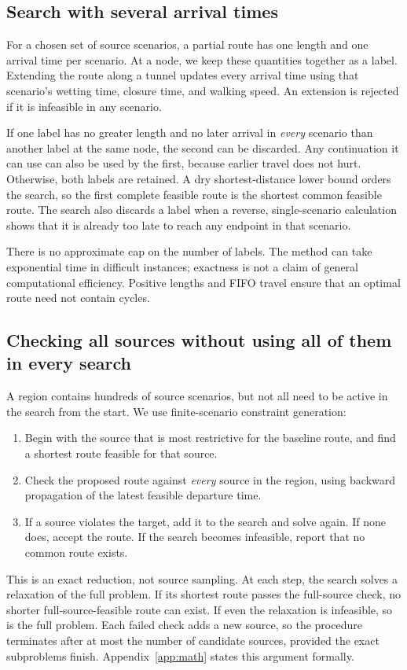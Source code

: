 \documentclass[11pt,a4paper]{article}
\begin{document}
\subsection{Search with several arrival times}
For a chosen set of source scenarios, a partial route has one length and one arrival time per scenario. At a node, we keep these quantities together as a label. Extending the route along a tunnel updates every arrival time using that scenario's wetting time, closure time, and walking speed. An extension is rejected if it is infeasible in any scenario.

If one label has no greater length and no later arrival in \emph{every} scenario than another label at the same node, the second can be discarded. Any continuation it can use can also be used by the first, because earlier travel does not hurt. Otherwise, both labels are retained. A dry shortest-distance lower bound orders the search, so the first complete feasible route is the shortest common feasible route. The search also discards a label when a reverse, single-scenario calculation shows that it is already too late to reach any endpoint in that scenario.

There is no approximate cap on the number of labels. The method can take exponential time in difficult instances; exactness is not a claim of general computational efficiency. Positive lengths and FIFO travel ensure that an optimal route need not contain cycles.

\subsection{Checking all sources without using all of them in every search}
A region contains hundreds of source scenarios, but not all need to be active in the search from the start. We use finite-scenario constraint generation:
\begin{enumerate}
\item Begin with the source that is most restrictive for the baseline route, and find a shortest route feasible for that source.
\item Check the proposed route against \emph{every} source in the region, using backward propagation of the latest feasible departure time.
\item If a source violates the target, add it to the search and solve again. If none does, accept the route. If the search becomes infeasible, report that no common route exists.
\end{enumerate}
This is an exact reduction, not source sampling. At each step, the search solves a relaxation of the full problem. If its shortest route passes the full-source check, no shorter full-source-feasible route can exist. If even the relaxation is infeasible, so is the full problem. Each failed check adds a new source, so the procedure terminates after at most the number of candidate sources, provided the exact subproblems finish. Appendix~\ref{app:math} states this argument formally.
\end{document}
